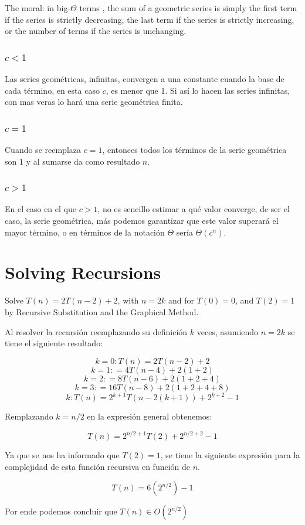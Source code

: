 \documentclass{article}
\begin{document}
The moral: in big-$\Theta$ terms , the sum of a geometric series is simply the first term if the series is strictly decreasing, the last term if the series is strictly increasing, or the number of terms if the series is unchanging.

\subsubsection{$c < 1$}
Las series geométricas, infinitas, convergen a una constante cuando la base de cada término, en esta caso $c$, es menor que 1. Si así lo hacen las series infinitas, con mas veras lo hará una serie geométrica finita.

\subsubsection{$c = 1$}
Cuando se reemplaza $c=1$, entonces todos los términos de la serie geométrica son $1$ y al sumarse da como resultado $n$.

\subsubsection{$c > 1$}
En el caso en el que $c > 1$, no es sencillo estimar a qué valor converge, de ser el caso, la serie geométrica, más podemos garantizar que este valor superará el mayor término, o en términos de la notación $\Theta$ sería $\Theta(c^n)$.

\section{Solving Recursions}
Solve $T(n) = 2 T(n-2) + 2$, with $n = 2k$ and for $T(0) = 0$, and $T(2) = 1$ by Recursive Substitution and the Graphical Method.

Al resolver la recursión reemplazando su definición $k$ veces, asumiendo $n = 2k$ se tiene el siguiente resultado:

$$k=0: 	T(n) = 2T(n-2) + 2 $$
$$k=1: 		 = 4T(n-4) + 2(1+2)$$
$$k=2: 		 = 8T(n-6) + 2(1+2+4)$$
$$k=3: 		 = 16T(n-8) + 2(1+2+4+8)$$
$$k: 	T(n)	 = 2^{k+1}T(n-2(k+1)) + 2^{k+2} - 1$$

Remplazando $k = n/2$ en la expresión general obtenemos:

$$T(n)	 = 2^{n/2+1}T(2) + 2^{n/2+2} - 1$$

Ya que se nos ha informado que $T(2) = 1$, se tiene la siguiente expresión para la complejidad de esta función recursiva en función de $n$.

\begin{equation}
	T(n)	 = 6(2^{n/2})- 1
\end{equation}

Por ende podemos concluir que $T(n) \in O(2^{n/2})$
\end{document}

